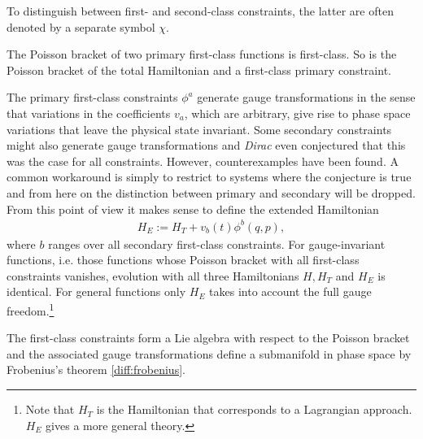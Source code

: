     \begin{notation}
        To distinguish between first- and second-class constraints, the latter are often denoted by a separate symbol $\chi$.
    \end{notation}
    \begin{property}[Closure]
        The Poisson bracket of two primary first-class functions is first-class. So is the Poisson bracket of the total Hamiltonian and a first-class primary constraint.
    \end{property}

    \begin{remark}
        The primary first-class constraints $\phi^a$ generate gauge transformations in the sense that variations in the coefficients $v_a$, which are arbitrary, give rise to phase space variations that leave the physical state invariant. Some secondary constraints might also generate gauge transformations and \textit{Dirac} even conjectured that this was the case for all constraints. However, counterexamples have been found. A common workaround is simply to restrict to systems where the conjecture is true and from here on the distinction between primary and secondary will be dropped. From this point of view it makes sense to define the extended Hamiltonian
        \begin{gather}
            H_E := H_T + v_b(t)\phi^b(q,p),
        \end{gather}
        where $b$ ranges over all secondary first-class constraints. For gauge-invariant functions, i.e. those functions whose Poisson bracket with all first-class constraints vanishes, evolution with all three Hamiltonians $H,H_T$ and $H_E$ is identical. For general functions only $H_E$ takes into account the full gauge freedom.\footnote{Note that $H_T$ is the Hamiltonian that corresponds to a Lagrangian approach. $H_E$ gives a more general theory.}
    \end{remark}
    \begin{result}
        The first-class constraints form a Lie algebra with respect to the Poisson bracket and the associated gauge transformations define a submanifold in phase space by Frobenius's theorem \ref{diff:frobenius}.
    \end{result}

